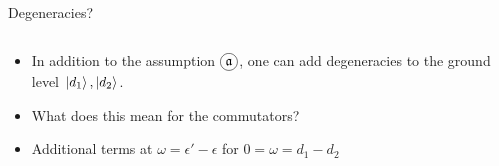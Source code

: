 \documentclass[10pt,xcolor={table,dvipsnames},t]{beamer}
\newcommand{\circledmathfrak}[1]{
  \tikz[baseline=(char.base)]{
    \node[shape=circle,draw,inner sep=2pt] (char) {$\mathfrak{#1}$};
  }
}
\begin{document}
\begin{frame}{Degeneracies?}
  \begin{columns}
    \begin{column}{0.75\textwidth}
      \begin{itemize}
        \item <1-> In addition to the assumption $\circledmathfrak{a}$, one can add degeneracies 
          to the ground level $\ket{d_1}, \ket{d_2}$.
        \item<2-> What does this mean for the commutators?
        \item<2-> Additional terms at $\omega = \epsilon' - \epsilon$ for $0 = \omega = d_1 - d_2$
      \end{itemize}
    \end{column}
    \begin{column}{0.25\textwidth}
      \vspace{-1.0cm}
    \end{column}
  \end{columns}
  \begin{itemize}

\end{itemize}
\end{frame}
\end{document}
